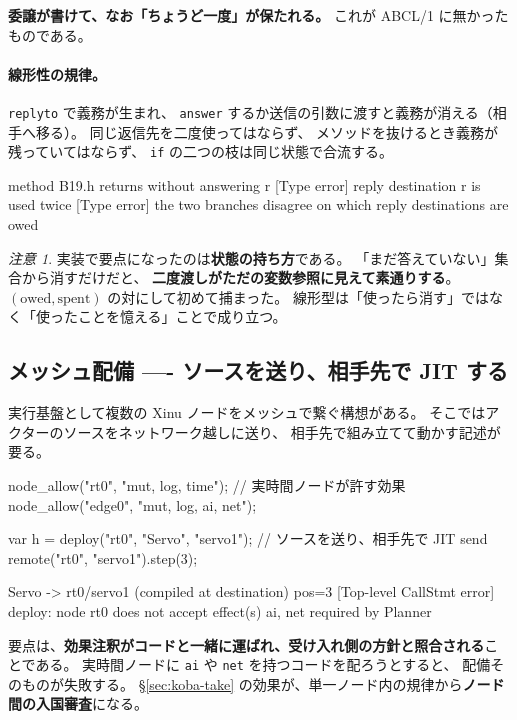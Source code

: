 \documentclass[11pt,a4paper]{ltjsarticle}
\theoremstyle{definition}
\theoremstyle{remark}
\newtheorem{remark}[theorem]{注意}
\begin{document}
\textbf{委譲が書けて、なお「ちょうど一度」が保たれる。}
これが ABCL/1 に無かったものである。

\paragraph{線形性の規律。}
\texttt{replyto} で義務が生まれ、
\texttt{answer} するか送信の引数に渡すと義務が消える（相手へ移る）。
同じ返信先を二度使ってはならず、
メソッドを抜けるとき義務が残っていてはならず、
\texttt{if} の二つの枝は同じ状態で合流する。

\begin{term}
 method B19.h returns without answering r
[Type error] reply destination r is used twice
[Type error] the two branches disagree on which reply destinations are owed
\end{term}

\begin{remark}
実装で要点になったのは\textbf{状態の持ち方}である。
「まだ答えていない」集合から消すだけだと、
\textbf{二度渡しがただの変数参照に見えて素通りする}。
$(\text{owed}, \text{spent})$ の対にして初めて捕まった。
線形型は「使ったら消す」ではなく「使ったことを憶える」ことで成り立つ。
\end{remark}

\subsection{メッシュ配備 ---- ソースを送り、相手先で JIT する}
\label{sec:mesh}

実行基盤として複数の Xinu ノードをメッシュで繋ぐ構想がある。
そこではアクターのソースをネットワーク越しに送り、
相手先で組み立てて動かす記述が要る。

\begin{aipl}
node_allow("rt0",   "mut, log, time");        // 実時間ノードが許す効果
node_allow("edge0", "mut, log, ai, net");

var h = deploy("rt0", "Servo", "servo1");     // ソースを送り、相手先で JIT
send remote("rt0", "servo1").step(3);
\end{aipl}
\begin{term}
[deploy] Servo -> rt0/servo1 (compiled at destination)
pos=3
[Top-level CallStmt error] deploy: node rt0 does not accept effect(s) {ai, net}
                           required by Planner
\end{term}

要点は、\textbf{効果注釈がコードと一緒に運ばれ、受け入れ側の方針と照合される}ことである。
実時間ノードに \texttt{ai} や \texttt{net} を持つコードを配ろうとすると、
配備そのものが失敗する。
\S\ref{sec:koba-take} の効果が、単一ノード内の規律から\textbf{ノード間の入国審査}になる。
\end{document}

